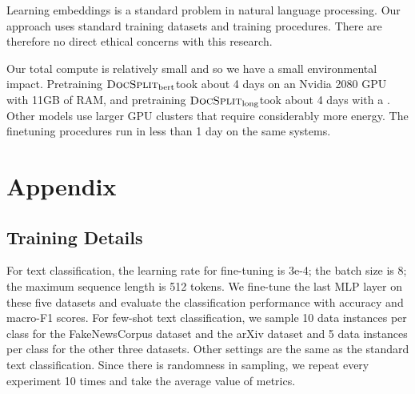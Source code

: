 \documentclass[11pt]{article}
\newcommand{\our}{\mbox{\textsc{DocSplit}}}
\newcommand{\ourbert}{$\our_{\mathrm{bert}}$}
\newcommand{\ourlong}{$\our_{\mathrm{long}}$}
\newcommand{\fixme}[1]{{\color{red}{FIXME: {#1}}}}
\begin{document}
Learning embeddings is a standard problem in natural language processing.
Our approach uses standard training datasets and training procedures.
There are therefore no direct ethical concerns with this research.

Our total compute is relatively small and so we have a small environmental impact.
Pretraining \ourbert took about 4 days on an Nvidia 2080 GPU with 11GB of RAM,
and pretraining \ourlong took about 4 days with a \fixme{GPU}.
Other models use larger GPU clusters that require considerably more energy.
The finetuning procedures run in less than 1 day on the same systems.






\clearpage
\appendix
\section{Appendix}

\subsection{Training Details}
\label{app:details}
For text classification, the learning rate for fine-tuning is 3e-4; the batch size is 8; the maximum sequence length is 512 tokens. 
We fine-tune the last MLP layer on these five datasets and evaluate the classification performance with accuracy and macro-F1 scores.
For few-shot text classification, we sample 10 data instances per class for the FakeNewsCorpus dataset and the arXiv dataset and 5 data instances per class for the other three datasets. 
Other settings are the same as the standard text classification. 
Since there is randomness in sampling, we repeat every experiment 10 times and take the average value of metrics.
\end{document}
